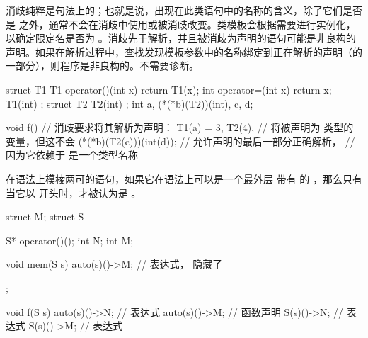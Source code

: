 \pnum
消歧纯粹是句法上的；也就是说，出现在此类语句中的名称的含义，除了它们是否是  之外，通常不会在消歧中使用或被消歧改变。类模板会根据需要进行实例化，以确定限定名是否为 。消歧先于解析，并且被消歧为声明的语句可能是非良构的声明。如果在解析过程中，查找发现模板参数中的名称绑定到正在解析的声明（的一部分），则程序是非良构的。不需要诊断。
\begin{example}
\begin{codeblock}
struct T1 {
  T1 operator()(int x) { return T1(x); }
  int operator=(int x) { return x; }
  T1(int) { }
};
struct T2 { T2(int) { } };
int a, (*(*b)(T2))(int), c, d;

void f() {
  // 消歧要求将其解析为声明：
  T1(a) = 3,
  T2(4),                        //  将被声明为  类型的变量，但这不会
  (*(*b)(T2(c)))(int(d));       // 允许声明的最后一部分正确解析，
                                // 因为它依赖于  是一个类型名称
}
\end{codeblock}
\end{example}


\pnum
在语法上模棱两可的语句，如果它在语法上可以是一个最外层  带有  的 ，那么只有当它以  开头时，才被认为是 。
\begin{example}
\begin{codeblock}
struct M;
struct S {
  S* operator()();
  int N;
  int M;

  void mem(S s) {
    auto(s)()->M;               // 表达式， 隐藏了 
  }
};

void f(S s) {
  {
    auto(s)()->N;               // 表达式
    auto(s)()->M;               // 函数声明
  }
  {
    S(s)()->N;                  // 表达式
    S(s)()->M;                  // 表达式
  }
}
\end{codeblock}
\end{example}
